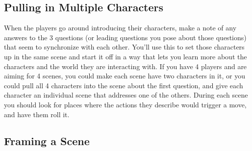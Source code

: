 \documentclass[
  oneside,
  statementpaper,
  9pt]{memoir}
\begin{document}
\hypertarget{pulling-in-multiple-characters}{%
\subsection{Pulling in Multiple
Characters}\label{pulling-in-multiple-characters}}

\begin{MC}

When the players go around introducing their characters, make a note of any answers to the 3 questions (or leading questions you pose about those questions) that seem to synchronize with each other. You’ll use this to set those characters up in the same scene and start it off in a way that lets you learn more about the characters and the world they are interacting with. If you have 4 players and are aiming for 4 scenes, you could make each scene have two characters in it, or you could pull all 4 characters into the scene about the first question, and give each character an individual scene that addresses one of the others. During each scene you should look for places where the actions they describe would trigger a move, and have them roll it.

\end{MC}

\hypertarget{framing-a-scene}{%
\subsection{Framing a Scene}\label{framing-a-scene}}
\end{document}
